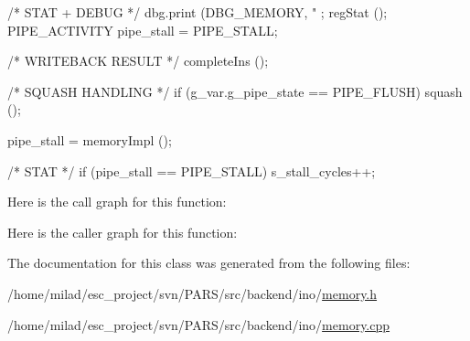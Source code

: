 \begin{DoxyCode}
                       {
    /* STAT + DEBUG */
    dbg.print (DBG_MEMORY, "%
      ;
    regStat ();
    PIPE_ACTIVITY pipe_stall = PIPE_STALL;

    /* WRITEBACK RESULT */
    completeIns ();

    /* SQUASH HANDLING */
    if (g_var.g_pipe_state == PIPE_FLUSH) { squash (); }

    pipe_stall = memoryImpl ();

    /* STAT */
    if (pipe_stall == PIPE_STALL) s_stall_cycles++;
}
\end{DoxyCode}


Here is the call graph for this function:




Here is the caller graph for this function:




The documentation for this class was generated from the following files:\begin{DoxyCompactItemize}
\item 
/home/milad/esc\_\-project/svn/PARS/src/backend/ino/\hyperlink{ino_2memory_8h}{memory.h}\item 
/home/milad/esc\_\-project/svn/PARS/src/backend/ino/\hyperlink{ino_2memory_8cpp}{memory.cpp}\end{DoxyCompactItemize}
